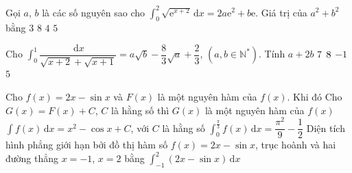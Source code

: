 \begin{ex}%
	Gọi $a$, $b$ là các số nguyên sao cho $\displaystyle\int_0^2{\sqrt{{\mathrm{e}^{x+2}}}\mathrm{\,d}x}=2a{\mathrm{e}^2}+b\mathrm e$.  Giá trị của ${a^2}+{b^2}$ bằng
	\choice 
		 {$3$}
		 {$8$}
		 {$4$}
		{\True  $5$}
\end{ex}

\begin{ex}%
	Cho $\displaystyle\int_0^1{\dfrac{\mathrm{\,d}x}{\sqrt{x+2}+\sqrt{x+1}}}=a\sqrt b-\dfrac83\sqrt a+\dfrac23$, $\left(a,b\in {{\mathbb{N}}^{*}}\right)$. Tính  $ a+2b$
	\choice 
		 {$ \text7$}
		{\True $  \text8$}
		 {$-1$}
		 {$5$}
\end{ex}



\begin{ex}%
	Cho $f(x)=2x-\sin x$ và $F(x)$ là một nguyên hàm của $f(x)$. Khi  đó
	 \choiceTF
		{\True Cho $G(x)=F(x)+C$,  $C$ là hằng số thì $G(x)$ là một nguyên hàm của $f(x)$}
		{$\displaystyle\int f(x)\mathrm{\,d}x=x^2-\cos x+C$, với  $C$ là hằng số}
		 {\True $\displaystyle\int_{0}^{\tfrac{\pi}{3}}f(x)\mathrm{\,d}x=\dfrac{\pi^2}{9}-\dfrac{1}{2}$}
		{Diện tích hình phẳng giới hạn bởi đồ thị hàm số $f(x)=2x-\sin  x$, trục hoành và hai đường thẳng $x=-1$, $x=2$ bằng $\displaystyle\int_{-1}^{2}(2x-\sin x)\mathrm{\,d}x$}
\end{ex}

